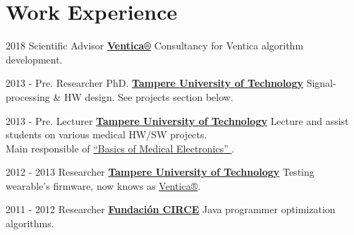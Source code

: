 \documentclass[letterpaper]{twentysecondcv} %
\begin{document}
\makeprofile %




\section{Work Experience}        
\begin{twenty}
	\twentyitem
    	{2018}
        {Scientific Advisor}
        {\href{https://www.ventica.net/}{\textbf{Ventica®}}}
        {}%
        {Consultancy for Ventica algorithm development.}

	\twentyitem
    	{2013 - Pre.}
        {Researcher PhD.}
        {\href{https://www.tut.fi/}{\textbf{Tampere University of Technology}}}
        {}%
        {Signal-processing \& HW design. See projects section below.} 
        
	\twentyitem
    	{2013 - Pre.}
        {Lecturer}
        {\href{https://www.tut.fi/}{\textbf{Tampere University of Technology}}}
        {}%
        {Lecture and assist students on various medical HW/SW projects.  
        \\ Main responsible of 
\href{https://www.youtube.com/watch?time_continue=1&v=E3D8rAG6S4Q}{“Basics of Medical Electronics” }.
        }

	\twentyitem
    	{2012 - 2013}
        {Researcher}
        {\href{https://www.tut.fi/}{\textbf{Tampere University of Technology}}}
         {}%
        {Testing wearable's firmware, now knows as \href{https://www.ventica.net/}{Ventica®}.   }

	\twentyitem
    	{2011 - 2012}
        {Researcher}
        {\href{https://http://www.fcirce.es//}{\textbf{Fundaci\'on CIRCE}}}
        {}%
        {Java programmer optimization algorithms.}
\end{twenty}


\end{document}
